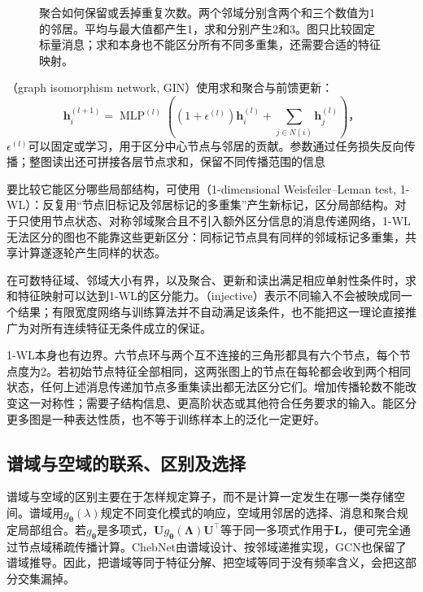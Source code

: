 \begin{figure}[htb]
  \centering
  
  \caption{聚合如何保留或丢掉重复次数。两个邻域分别含两个和三个数值为1的邻居。平均与最大值都产生1，求和分别产生2和3。图只比较固定标量消息；求和本身也不能区分所有不同多重集，还需要合适的特征映射。}
  \label{fig:gnn-aggregation}
\end{figure}

（graph isomorphism network, GIN）使用求和聚合与前馈更新：
\begin{equation}
  \bm{h}_i^{(l+1)}=\operatorname{MLP}^{(l)}\!\left(
    (1+\epsilon^{(l)})\bm{h}_i^{(l)}
      +\sum_{j\in N(i)}\bm{h}_j^{(l)}\right)\text{，}
  \label{eq:gnn-gin}
\end{equation}
$\epsilon^{(l)}$可以固定或学习，用于区分中心节点与邻居的贡献。参数通过任务损失反向传播；整图读出还可拼接各层节点求和，保留不同传播范围的信息

要比较它能区分哪些局部结构，可使用（1-dimensional Weisfeiler--Leman test, 1-WL）：反复用“节点旧标记及邻居标记的多重集”产生新标记，区分局部结构。对于只使用节点状态、对称邻域聚合且不引入额外区分信息的消息传递网络，1-WL无法区分的图也不能靠这些更新区分：同标记节点具有同样的邻域标记多重集，共享计算遂逐轮产生同样的状态。

在可数特征域、邻域大小有界，以及聚合、更新和读出满足相应单射性条件时，求和特征映射可以达到1-WL的区分能力。（injective）表示不同输入不会被映成同一个结果；有限宽度网络与训练算法并不自动满足该条件，也不能把这一理论直接推广为对所有连续特征无条件成立的保证。

1-WL本身也有边界。六节点环与两个互不连接的三角形都具有六个节点，每个节点度为2。若初始节点特征全部相同，这两张图上的节点在每轮都会收到两个相同状态，任何上述消息传递加节点多重集读出都无法区分它们。增加传播轮数不能改变这一对称性；需要子结构信息、更高阶状态或其他符合任务要求的输入。能区分更多图是一种表达性质，也不等于训练样本上的泛化一定更好。

\subsection{谱域与空域的联系、区别及选择}
\label{sec:gnn-spectral-spatial-comparison}

谱域与空域的区别主要在于怎样规定算子，而不是计算一定发生在哪一类存储空间。谱域用$g_{\bm{\theta}}(\lambda)$规定不同变化模式的响应，空域用邻居的选择、消息和聚合规定局部组合。若$g_{\bm{\theta}}$是多项式，$\bm{U}g_{\bm{\theta}}(\bm{\Lambda})\bm{U}^{\top}$等于同一多项式作用于$\bm{L}$，便可完全通过节点域稀疏传播计算。ChebNet由谱域设计、按邻域递推实现，GCN也保留了谱域推导。因此，把谱域等同于特征分解、把空域等同于没有频率含义，会把这部分交集漏掉。

